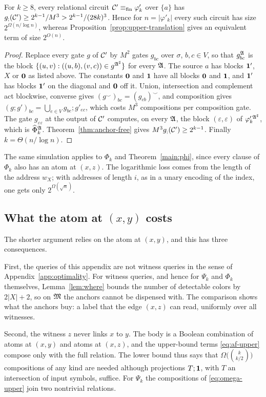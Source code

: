 \begin{theorem}\label{thm:af-fixed}
For $k\ge8$, every relational circuit $\mathcal C'\equiv_{\rm fin}\varphi'_k$
over $\{a\}$ has $g_{;}(\mathcal C')\ge2^{k-1}/M^3>2^{k-1}/(28k)^3$. Hence for
$n=|\varphi'_k|$ every such circuit has size $2^{\Omega(n/\log n)}$,
whereas Proposition~\ref{prop:upper-translation} gives an equivalent term
of size $2^{O(n)}$.
\end{theorem}
\begin{proof}
Replace every gate $g$ of $\mathcal C'$ by $M^2$ gates $g_{bc}$ over $\sigma$,
$b,c\in V$, so that $g_{bc}^{\mathfrak A}$ is the block $\{(u,v):((u,b),(v,c))\in
g^{\mathfrak A^\sharp}\}$ for every $\mathfrak A$. The source $a$ has blocks $\mathbf{1}'$, $X$ or
$\mathbf{0}$ as listed above. The constants $\mathbf{0}$ and $\mathbf{1}$ have all blocks
$\mathbf{0}$ and $\mathbf{1}$, and $\mathbf{1}'$ has blocks $\mathbf{1}'$ on the diagonal and $\mathbf{0}$
off it. Union, intersection and complement act blockwise, converse gives
$(g^\smile)_{bc}=(g_{cb})^\smile$, and composition gives
$(g;g')_{bc}=\bigcup_{e\in V}g_{be};g'_{ec}$, which costs $M^3$ compositions
per composition gate. The gate $g_{\varepsilon\varepsilon}$ at the output of $\mathcal C'$
computes, on every $\mathfrak A$, the block $(\varepsilon,\varepsilon)$ of $\varphi'^{\,\mathfrak A^\sharp}_k$, which is
$\widehat\Phi_k^{\mathfrak A}$. Theorem~\ref{thm:anchor-free} gives
$M^3g_{;}(\mathcal C')\ge2^{k-1}$. Finally $k=\Theta(n/\log n)$.
\end{proof}
The same simulation applies to $\Phi_k$ and Theorem~\ref{main:phi}, since
every clause of $\Phi_k$ also has an atom at $(x,z)$. The logarithmic loss
comes from the length of the address $w_X$; with addresses of length $i$,
as in a unary encoding of the index, one gets only $2^{\Omega(\sqrt n)}$.

\subsection{What the atom at $(x,y)$ costs}
The shorter argument relies on the atom at $(x,y)$, and this has three
consequences.

First, the queries of this appendix are not witness queries in the sense
of Appendix~\ref{app:optimality}. For witness queries, and hence for
$\Psi_k$ and $\Phi_k$ themselves, Lemma~\ref{lem:where} bounds the number
of detectable colors by $2|X|+2$, so on $\mathfrak M$ the anchors cannot be
dispensed with. The comparison shows what the anchors buy: a label that
the edge $(x,z)$ can read, uniformly over all witnesses.

Second, the witness $z$ never links $x$ to $y$. The body is a Boolean
combination of atoms at $(x,y)$ and atoms at $(x,z)$, and the upper-bound
terms \eqref{eq:af-upper} compose only with the full relation. The lower
bound thus says that $\Omega\bigl(\binom{k}{k/2}\bigr)$ compositions of
any kind are needed although projections $T;\mathbf{1}$, with $T$ an
intersection of input symbols, suffice. For $\Psi_k$ the compositions of
\eqref{eq:omega-upper} join two nontrivial relations.

